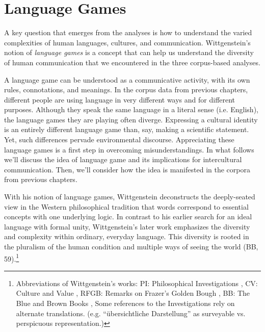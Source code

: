 \section{Language Games}

A key question that emerges from the analyses is how to understand the varied complexities of human languages, cultures, and communication. Wittgenstein's notion of \textit{language games} is a concept that can help us understand the diversity of human communication that we encountered in the three corpus-based analyses.  

A language game can be understood as a communicative activity, with its own rules, connotations, and meanings. In the corpus data from previous chapters, different people are using language in very different ways and for different purposes. Although they speak the same language in a literal sense (i.e. English), the language games they are playing often diverge. Expressing a cultural identity is an entirely different language game than, say, making a scientific statement. Yet, such differences pervade environmental discourse. Appreciating these language games is a first step in overcoming misunderstandings. In what follows we'll discuss the idea of language game and its implications for intercultural communication. Then, we'll consider how the idea is manifested in the corpora from previous chapters.   

With his notion of language games, Wittgenstein deconstructs the deeply-seated view in the Western philosophical tradition that words correspond to essential concepts with one underlying logic. In contrast to his earlier search for an ideal language with formal unity, Wittgenstein's later work emphasizes the diversity and complexity within ordinary, everyday language. This diversity is rooted in the pluralism of the human condition and multiple ways of seeing the world (BB, 59).\footnote{Abbreviations of Wittgenstein's works: PI: Philosophical Investigations \citep{Wittgenstein1986a}, CV: Culture and Value \citep{Wittgenstein1998b}, RFGB: Remarks on Frazer's Golden Bough \citep{Wittgenstein1993a}, BB: The Blue and Brown Books \citep{Wittgenstein1998c}, Some references to the Investigations rely on alternate translations. (e.g. ``\"ubersichtliche Darstellung'' as surveyable vs. perspicuous representation.)}


